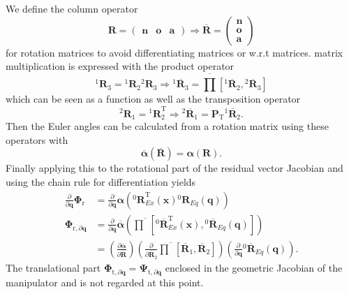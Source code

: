 \documentclass[twocolumn,10pt]{IFTOMM}
\newcommand{\bm}[1]{\boldsymbol{#1}}
\newcommand{\rotmat}[2]{{{ }^{#1}\boldsymbol{R}}_{#2}}
\newcommand{\rotmato}[2]{{{ }^{#1}\boldsymbol{\overline{R}}}_{#2}}
\newcommand{\transp}[0]{{\mathrm{T}}}
\begin{document}
We define the column operator
%
\begin{equation}
\bm{R}=\begin{pmatrix}
\bm{n} & \bm{o} & \bm{a}
\end{pmatrix}
\Rightarrow
\overline{\bm{R}}=\begin{pmatrix}
\bm{n} \\ \bm{o} \\ \bm{a}
\end{pmatrix}
\end{equation}
%
for rotation matrices to avoid differentiating matrices or w.r.t matrices.
matrix multiplication is expressed with the product operator
%
\begin{equation}
\rotmat{1}{3}
=
\rotmat{1}{2}
\rotmat{2}{3}
\Rightarrow
\rotmato{1}{3}
=
\overline{\prod}\left[ \rotmato{1}{2}, \rotmato{2}{3}\right]
\label{equ:matprod}
\end{equation}
%
which can be seen as a function as well as the transposition operator
%
\begin{equation}
\rotmat{2}{1}
=
\rotmat{1}{2}^\transp
\Rightarrow
\rotmato{2}{1}
=
\bm{P}_\transp \rotmato{1}{2}.
\end{equation}
%
Then the Euler angles can be calculated from a rotation matrix using these operators with
%
\begin{equation}
\overline{\bm{\alpha}}(\overline{\bm{R}})
=
\bm{\alpha}(\bm{R}).
\end{equation}
%
Finally applying this to the rotational part of the residual vector Jacobian and using the chain rule for differentiation yields
%
\begin{align}
\frac{\partial}{\partial \bm{q}}\bm{\Phi}_{\mathrm{r}}
&=
\frac{\partial}{\partial \bm{q}} \bm{\alpha}\left(\rotmat{0}{Ex}^\transp(\bm{x}) \rotmat{0}{Eq}(\bm{q})\right) \label{equ:grad_Phi_q}\\
\bm{\Phi}_{\mathrm{r},\partial\bm{q}}
&=
\frac{\partial}{\partial \bm{q}} \overline{\bm{\alpha}}\left(\overline{\prod}\left[ \rotmato{0}{Ex}^\transp(\bm{x}), \rotmato{0}{Eq}(\bm{q})\right]\right) \nonumber \\
&=
\left(\frac{\partial \overline{\bm{\alpha}}}{\partial \overline{\bm{R}}}\right)
\left(\frac{\partial }{\partial \overline{\bm{R}}_2}
\overline{\prod}\left[ \overline{\bm{R}}_1, \overline{\bm{R}}_2\right]\right)
\left(\frac{\partial}{\partial \bm{q}} \rotmato{0}{Eq}(\bm{q})\right).  \nonumber
\end{align}
The translational part $\bm{\Phi}_{\mathrm{t},\partial\bm{q}}=\bm{\Psi}_{\mathrm{t},\partial\bm{q}}$ enclosed in the geometric Jacobian of the manipulator and is not regarded at this point.
\end{document}
